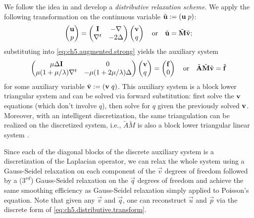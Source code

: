 We follow the idea in \cite{Zhu.Yongning10} and develop a \emph{distributive relaxation scheme}. We apply the following transformation on the continuous variable $\tilde{\mathbf{u}} := (\mathbf{u} \; p)$:
\begin{equation} \label{eq:ch5.distributive.transform}
\begin{pmatrix} \mathbf{u} \\ p \end{pmatrix}
= \begin{pmatrix} \mathbf{I} & -\nabla \\ \nabla^t & -2 \Delta \end{pmatrix}
\begin{pmatrix} \mathbf{v} \\ q \end{pmatrix}
\quad \text{or} \quad
\tilde{\mathbf{u}} = \tilde{\mathbf{M}} \tilde{\mathbf{v}};
\end{equation}
substituting into \eqref{eq:ch5.augmented.strong} yields the auxiliary system
\begin{equation} \label{eq:ch5.distributive.triangularized}
\begin{pmatrix} \mu \Delta \mathbf{I} & 0 \\ \mu (1 + \mu / \lambda) \nabla^t & -\mu (1 + 2\mu / \lambda) \Delta \end{pmatrix}
\begin{pmatrix} \mathbf{v} \\ q \end{pmatrix}
= \begin{pmatrix} \mathbf{f} \\ 0 \end{pmatrix}
\quad \text{or} \quad
\tilde{\mathbf{A}} \tilde{\mathbf{M}} \tilde{\mathbf{v}} = \tilde{\mathbf{f}}
\end{equation}
for some auxiliary variable $\tilde{\mathbf{v}} := (\mathbf{v} \; q)$. This auxiliary system is a block lower triangular system and can be solved via forward substitution: first solve the $\mathbf{v}$ equations (which don't involve $q$), then solve for $q$ given the previously solved $\mathbf{v}$. Moreover, with an intelligent discretization, the same triangulation can be realized on the discretized system, i.e., $\tilde{A} \tilde{M}$ is also a block lower triangular linear system \cite{Zhu.Yongning10}.

Since each of the diagonal blocks of the discrete auxiliary system is a discretization of the Laplacian operator, we can relax the whole system using a Gauss-Seidel relaxation on each component of the $\vec{v}$ degrees of freedom followed by a ($3^{rd}$) Gauss-Seidel relaxation on the $\vec{q}$ degrees of freedom and achieve the same smoothing efficiency as Gauss-Seidel relaxation simply applied to Poisson's equation. Note that given any $\vec{v}$ and $\vec{q}$, one can reconstruct $\vec{u}$ and $\vec{p}$ via the discrete form of \eqref{eq:ch5.distributive.transform}.

